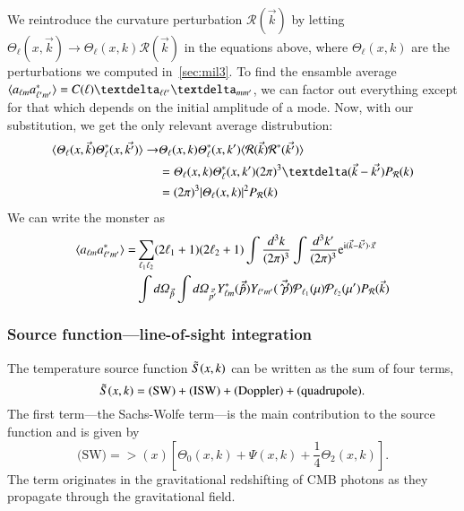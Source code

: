 We reintroduce the curvature perturbation $\mathcal{R}(\vec{k})$ by letting $\Theta_\ell(x,\vec{k}) \to \Theta_\ell(x,k) \mathcal{R}(\vec{k})$ in the equations above, where $\Theta_\ell(x, k)$ are the perturbations we computed in~\cref{sec:mil3}. To find the ensamble average $\langle a\ellm a^*\ellmp \rangle = C(\ell) \deltasym{\ell \ell'} \deltasym{mm'}$, we can factor out everything except for that which depends on the initial amplitude of a mode. Now, with our substitution, we get the only relevant average distrubution:
\begin{equation}
\begin{split}
    \langle \Theta_\ell(x,\vec{k}) \Theta_\ell^*(x,\vec{k'})\rangle \to& \Theta_\ell(x,k) \Theta_\ell^*(x,k') \langle \mathcal{R}(\vec{k}) \mathcal{R}^*(\vec{k'}) \rangle \\
    &=  \Theta_\ell(x,k) \Theta_\ell^*(x,k')(2\pi)^3 \deltafunc{\vec{k}-\vec{k'}} P_\mathcal{R}(k) \\
    &= (2\pi)^3 \abs{\Theta_\ell(x,k)}^2 P_\mathcal{R}(k) 
\end{split}
\end{equation}
We can write the monster as
\begin{equation}
\begin{split}
    \langle a\ellm a^*\ellmp \rangle =& \sum_{\ell_1 \ell_2} (2\ell_1 +1) (2\ell_2 +1) \int \frac{d^3k}{(2\pi)^3} \int \frac{d^3k'}{(2\pi)^3}\eu[\im (\vec{k}-\vec{k'})\cdot \vec{x}] \\
    &\int \dOmg[p] \int \dOmg[p'] Y_{\ell m}^*(\vec{\hat{p}}) Y_{\ell' m'}(\vec{\hat{p}'}) \mathcal{P}_{\ell_1}(\mu)\mathcal{P}_{\ell_2}(\mu') P_\mathcal{R}(\vec{k})
\end{split}
\end{equation}






\subsubsection{Source function---line-of-sight integration}
    The temperature source function $\tilde{S}(x,k)$ can be written as the sum of four terms,
    \begin{equation}\label{mil4:theo:eq:source_function_four_terms}
        \tilde{S}(x,k) = \text{(SW)} + \text{(ISW)} + \text{(Doppler)} + \text{(quadrupole)}.
    \end{equation}
    The first term---the Sachs-Wolfe term---is the main contribution to the source function and is given by
    \begin{equation}
        \text{(SW)} = \gt(x) \left[\Theta_0(x,k) + \Psi(x,k) + \frac{1}{4}\Theta_2(x,k) \right].
    \end{equation}
    The term originates in the gravitational redshifting of CMB photons as they propagate through the gravitational field.

